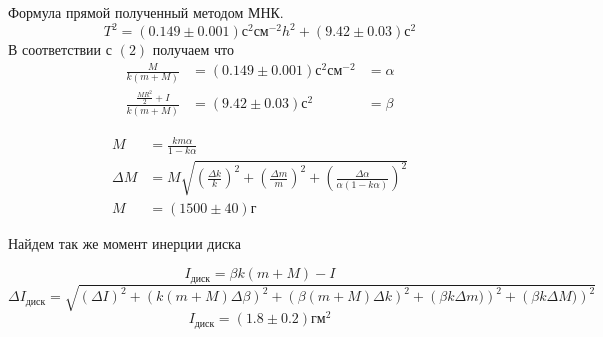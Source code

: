 \documentclass[a4paper, 12pt]{article}
\begin{document}
    Формула прямой полученный методом МНК.
    \[T^2 = (0.149 \pm 0.001)с^2см^{-2} h^2 + (9.42 \pm 0.03)с^2\]
    В соответствии с $(2)$ получаем что
    \begin{align*}
    \frac{M}{k(m+M)}&=(0.149 \pm 0.001)с^2см^{-2} &=\alpha \\
    \frac{\frac{MR^2}{2}+I}{k(m+M)}&=(9.42 \pm 0.03)с^2 &=\beta
    \end{align*}

    \begin{align*}
    M&=\frac{km\alpha}{1-k\alpha}\\
    \Delta M &= M\sqrt{\left(\frac{\Delta k}{k}\right)^2 +
                     \left(\frac{\Delta m}{m}\right)^2 +
                     \left(\frac{\Delta \alpha}{\alpha(1-k\alpha)}\right)^2}\\
    M &= (1500 \pm 40)г
    \end{align*}

    Найдем так же момент инерции диска

    \[I_{диск} =\beta k(m+M) - I\]
    \[\Delta I_{диск} = \sqrt{\left({\Delta I}\right)^2 +
                      \left({k(m+M)\Delta\beta}\right)^2 +
                      \left({\beta(m+M)\Delta k}\right)^2 +
                      \left({\beta k \Delta m})\right)^2 +
                      \left({\beta k \Delta M})\right)^2}
\]
    \[I_{диск}=(1.8\pm0.2)гм^2\]
\end{document}
